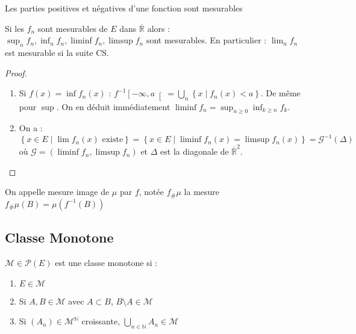 \documentclass{cours}
\begin{document}
    \begin{corollary}
        Les parties positives et négatives d'une fonction sont mesurables
    \end{corollary}
    \begin{proposition}
        Si les $f_n$ sont mesurables de $E$ dans $\overline{\mathbb{R}}$ alors : $\sup_n f_n, \inf_n f_n, \liminf f_n, \limsup f_n$ sont mesurables.
        En particulier : $\lim_n f_n$ est mesurable si la suite CS.
    \end{proposition}
    \begin{proof}
        \begin{enumerate}
            \item Si $f(x) = \inf f_{n}(x)$ : $f^{-1}\left[-\infty, a\right[ = \bigcup_{n} \left\{x \mid f_{n}(x) < a\right\}$. De même pour $\sup$. On en déduit immédiatement $\liminf f_n = \sup_{n \geq 0} \inf_{k \geq n} f_{k}$.
            \item On a : $\left\{x\in E\mid \lim f_{n}(x) \text{ existe}\right\} = \left\{x \in E \mid \liminf f_{n}(x) = \limsup f_{n}(x)\right\} = \mathcal{G}^{-1}(\Delta)$ où $\mathcal{G} = (\liminf f_{n}, \limsup f_{n})$ et $\Delta$ est la diagonale de $\overline{\mathbb{R}}^{2}$.
        \end{enumerate}
    \end{proof}
    \begin{definition}
        On appelle mesure image de $\mu$ par $f$, notée $f_{\#}\mu$ la mesure $f_{\#}\mu(B) = \mu(f^{-1}(B))$
    \end{definition}

    \subsection{Classe Monotone}
    \begin{definition}
        $\mathcal{M} \in \mathcal{P}(E)$ est une classe monotone si :
        \begin{enumerate}
            \item $E\in \mathcal{M}$
            \item Si $A, B \in \mathcal{M}$ avec $A\subset B$, $B \setminus A \in \mathcal{M}$
            \item Si $(A_{n}) \in \mathcal{M}^{\mathbb{N}}$ croissante, $\bigcup\limits_{n\in\mathbb{N}} A_{n} \in \mathcal{M}$
        \end{enumerate}
    \end{definition}
\end{document}
